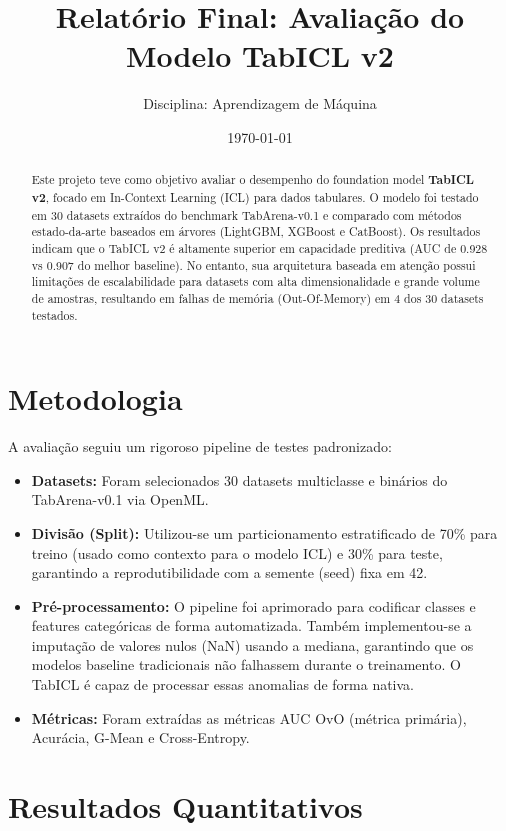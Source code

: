 \documentclass[12pt,a4paper]{article}
\title{Relatório Final: Avaliação do Modelo TabICL v2}
\author{Disciplina: Aprendizagem de Máquina}
\date{\today}
\begin{document}
\maketitle

\begin{abstract}
Este projeto teve como objetivo avaliar o desempenho do foundation model \textbf{TabICL v2}, focado em In-Context Learning (ICL) para dados tabulares. O modelo foi testado em 30 datasets extraídos do benchmark TabArena-v0.1 e comparado com métodos estado-da-arte baseados em árvores (LightGBM, XGBoost e CatBoost). Os resultados indicam que o TabICL v2 é altamente superior em capacidade preditiva (AUC de 0.928 vs 0.907 do melhor baseline). No entanto, sua arquitetura baseada em atenção possui limitações de escalabilidade para datasets com alta dimensionalidade e grande volume de amostras, resultando em falhas de memória (Out-Of-Memory) em 4 dos 30 datasets testados.
\end{abstract}

\section{Metodologia}

A avaliação seguiu um rigoroso pipeline de testes padronizado:
\begin{itemize}
    \item \textbf{Datasets:} Foram selecionados 30 datasets multiclasse e binários do TabArena-v0.1 via OpenML.
    \item \textbf{Divisão (Split):} Utilizou-se um particionamento estratificado de 70\% para treino (usado como contexto para o modelo ICL) e 30\% para teste, garantindo a reprodutibilidade com a semente (seed) fixa em 42.
    \item \textbf{Pré-processamento:} O pipeline foi aprimorado para codificar classes e features categóricas de forma automatizada. Também implementou-se a imputação de valores nulos (NaN) usando a mediana, garantindo que os modelos baseline tradicionais não falhassem durante o treinamento. O TabICL é capaz de processar essas anomalias de forma nativa.
    \item \textbf{Métricas:} Foram extraídas as métricas AUC OvO (métrica primária), Acurácia, G-Mean e Cross-Entropy.
\end{itemize}

\section{Resultados Quantitativos}
\end{document}
